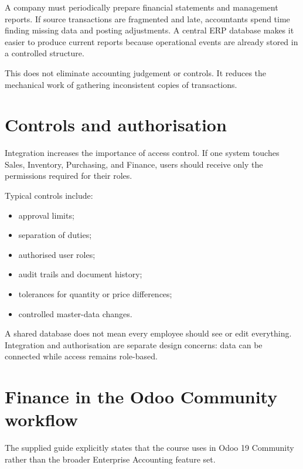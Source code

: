 A company must periodically prepare financial statements and management reports. If source transactions are fragmented and late, accountants spend time finding missing data and posting adjustments. A central ERP database makes it easier to produce current reports because operational events are already stored in a controlled structure.

This does not eliminate accounting judgement or controls. It reduces the mechanical work of gathering inconsistent copies of transactions.

\section{Controls and authorisation}

Integration increases the importance of access control. If one system touches Sales, Inventory, Purchasing, and Finance, users should receive only the permissions required for their roles.

Typical controls include:

\begin{itemize}
  \item approval limits;
  \item separation of duties;
  \item authorised user roles;
  \item audit trails and document history;
  \item tolerances for quantity or price differences;
  \item controlled master-data changes.
\end{itemize}

\begin{pitfall}
A shared database does not mean every employee should see or edit everything. Integration and authorisation are separate design concerns: data can be connected while access remains role-based.
\end{pitfall}

\section{Finance in the Odoo Community workflow}

The supplied guide explicitly states that the course uses  in Odoo 19 Community rather than the broader Enterprise Accounting feature set.

